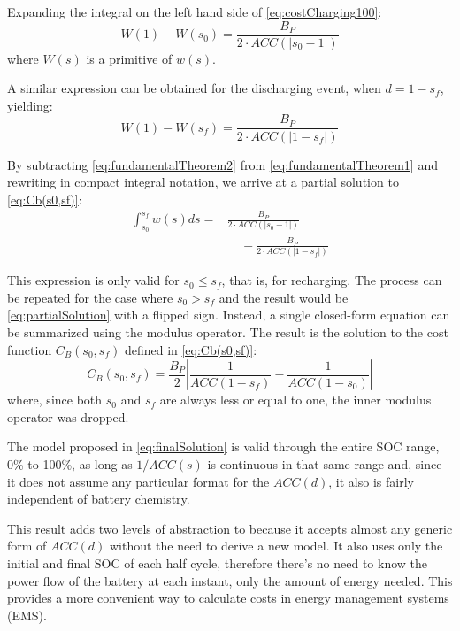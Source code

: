 \documentclass{ieeeaccess}
\begin{document}
    Expanding the integral on the left hand side of \eqref{eq:costCharging100}:
    \begin{equation}
        W(1) - W(s_{0}) = \frac{B_{P}}{2 \cdot ACC(|s_{0}-1|)}
        \label{eq:fundamentalTheorem1}
    \end{equation}
    where $W(s)$ is a primitive of $w(s)$.

    A similar expression can be obtained for the discharging event, when $d=1-s_{f}$, yielding:
    \begin{equation}
        W(1) - W(s_{f}) = \frac{B_{P}}{2 \cdot ACC(|1-s_{f}|)}
        \label{eq:fundamentalTheorem2}
    \end{equation}

    By subtracting \eqref{eq:fundamentalTheorem2} from \eqref{eq:fundamentalTheorem1} and rewriting in compact integral notation, we arrive at a partial solution to \eqref{eq:Cb(s0,sf)}:
    \begin{equation}
        \begin{aligned}
            \int_{s_{0}}^{s_{f}}w(s)ds = & \frac{B_{P}}{2 \cdot ACC(|s_{0}-1|)}            \\
            & \;\;\;\; - \frac{B_{P}}{2 \cdot ACC(|1-s_{f}|)}
        \end{aligned}
        \label{eq:partialSolution}
    \end{equation}

    This expression is only valid for $s_{0} \le s_{f}$, that is, for recharging. The process can be repeated for the case where $s_{0} > s_{f}$ and the result would be \eqref{eq:partialSolution} with a flipped sign. Instead, a single closed-form equation can be summarized using the modulus operator. The result is the solution to the cost function $C_{B}(s_{0}, s_{f})$ defined in \eqref{eq:Cb(s0,sf)}:
    \begin{equation}
        C_{B}(s_{0}, s_{f}) = \frac{B_{P}}{2} \left| \frac{1}{ACC(1-s_{f})} - \frac{1}{ACC(1-s_{0})} \right|
        \label{eq:finalSolution}
    \end{equation}
    where, since both $s_{0}$ and $s_{f}$ are always less or equal to one, the inner modulus operator was dropped.

    The model proposed in \eqref{eq:finalSolution} is valid through the entire SOC range, 0\% to 100\%, as long as $1/ACC(s)$ is continuous in that same range and, since it does not assume any particular format for the $ACC(d)$, it also is fairly independent of battery chemistry.

    This result adds two levels of abstraction to \cite{HAN2014} because it accepts almost any generic form of $ACC(d)$ without the need to derive a new model. It also uses only the initial and final SOC of each half cycle, therefore there's no need to know the power flow of the battery at each instant, only the amount of energy needed. This provides a more convenient way to calculate costs in energy management systems (EMS).
\end{document}
